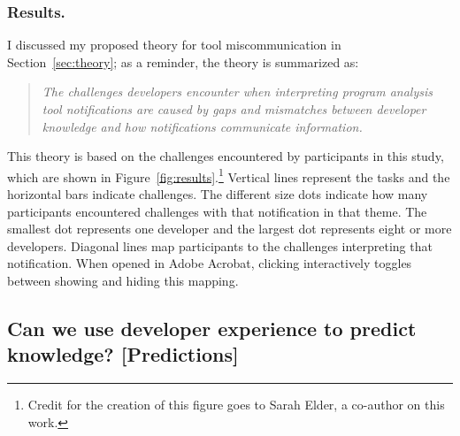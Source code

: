 \documentclass{llncs}
\begin{document}
\subsubsection{Results.} 
I discussed my proposed theory for tool miscommunication in Section~\ref{sec:theory}; as a reminder, the theory is summarized as:

\begin{quotation}
	\noindent
	\emph{The challenges developers encounter when interpreting program analysis tool notifications are caused by gaps and mismatches between developer knowledge and how notifications communicate information.}
\end{quotation}

This theory is based on the challenges encountered by participants in this study, which are shown in  Figure~\ref{fig:results}.\footnote{Credit for the creation of this figure goes to Sarah Elder, a co-author on this work.}
Vertical lines represent the tasks and the horizontal bars indicate challenges.
The different size dots indicate how many participants encountered challenges with that notification in that theme. 
The smallest dot represents one developer and the largest dot represents eight or more developers.
Diagonal lines map participants to the challenges interpreting that notification.
\setlength\fboxsep{1pt}
When opened in Adobe Acrobat, clicking  
interactively toggles between showing and hiding this mapping.

\subsection{Can we use developer experience to predict knowledge? [Predictions]}\label{subsec:s3}
\end{document}
